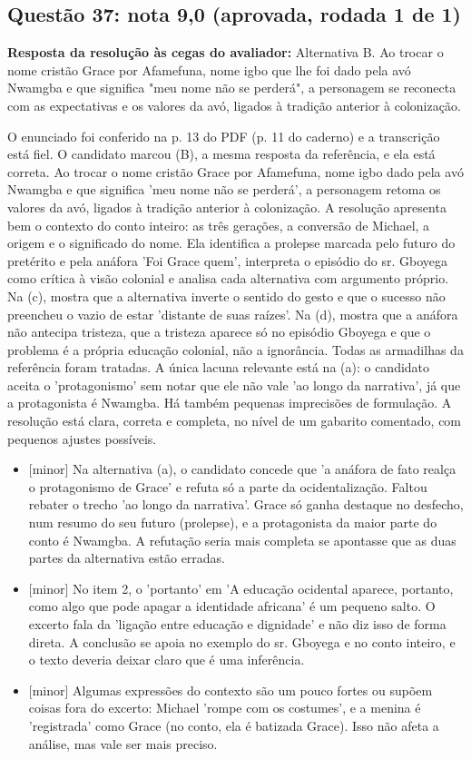 \documentclass{article}%
\begin{document}
\subsection*{Questão 37: nota 9,0 (aprovada, rodada 1 de 1)}%
\textbf{Resposta da resolução às cegas do avaliador:} Alternativa B. Ao trocar o nome cristão Grace por Afamefuna, nome igbo que lhe foi dado pela avó Nwamgba e que significa "meu nome não se perderá", a personagem se reconecta com as expectativas e os valores da avó, ligados à tradição anterior à colonização.\par %
O enunciado foi conferido na p. 13 do PDF (p. 11 do caderno) e a transcrição está fiel. O candidato marcou (B), a mesma resposta da referência, e ela está correta. Ao trocar o nome cristão Grace por Afamefuna, nome igbo dado pela avó Nwamgba e que significa 'meu nome não se perderá', a personagem retoma os valores da avó, ligados à tradição anterior à colonização. A resolução apresenta bem o contexto do conto inteiro: as três gerações, a conversão de Michael, a origem e o significado do nome. Ela identifica a prolepse marcada pelo futuro do pretérito e pela anáfora 'Foi Grace quem', interpreta o episódio do sr. Gboyega como crítica à visão colonial e analisa cada alternativa com argumento próprio. Na (c), mostra que a alternativa inverte o sentido do gesto e que o sucesso não preencheu o vazio de estar 'distante de suas raízes'. Na (d), mostra que a anáfora não antecipa tristeza, que a tristeza aparece só no episódio Gboyega e que o problema é a própria educação colonial, não a ignorância. Todas as armadilhas da referência foram tratadas. A única lacuna relevante está na (a): o candidato aceita o 'protagonismo' sem notar que ele não vale 'ao longo da narrativa', já que a protagonista é Nwamgba. Há também pequenas imprecisões de formulação. A resolução está clara, correta e completa, no nível de um gabarito comentado, com pequenos ajustes possíveis.%
\begin{itemize}%
\item%
{[}minor{]} Na alternativa (a), o candidato concede que 'a anáfora de fato realça o protagonismo de Grace' e refuta só a parte da ocidentalização. Faltou rebater o trecho 'ao longo da narrativa'. Grace só ganha destaque no desfecho, num resumo do seu futuro (prolepse), e a protagonista da maior parte do conto é Nwamgba. A refutação seria mais completa se apontasse que as duas partes da alternativa estão erradas.%
\item%
{[}minor{]} No item 2, o 'portanto' em 'A educação ocidental aparece, portanto, como algo que pode apagar a identidade africana' é um pequeno salto. O excerto fala da 'ligação entre educação e dignidade' e não diz isso de forma direta. A conclusão se apoia no exemplo do sr. Gboyega e no conto inteiro, e o texto deveria deixar claro que é uma inferência.%
\item%
{[}minor{]} Algumas expressões do contexto são um pouco fortes ou supõem coisas fora do excerto: Michael 'rompe com os costumes', e a menina é 'registrada' como Grace (no conto, ela é batizada Grace). Isso não afeta a análise, mas vale ser mais preciso.%
\end{itemize}%
\end{document}
